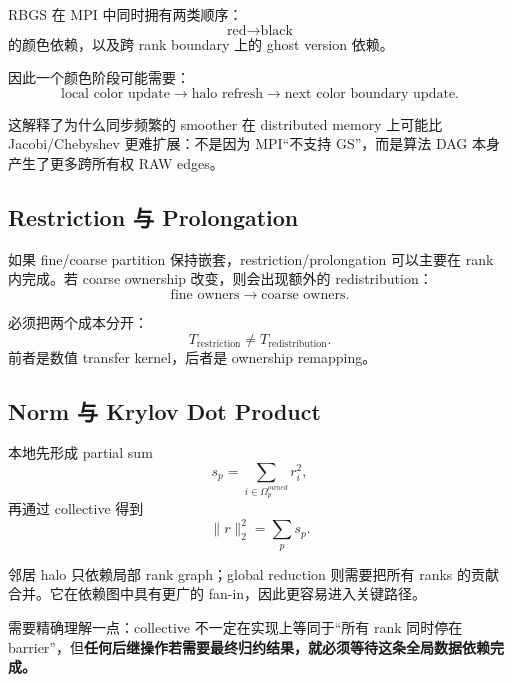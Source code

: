 RBGS 在 MPI 中同时拥有两类顺序：
\begin{equation}
\text{red}
\rightarrow
\text{black}
\end{equation}
的颜色依赖，以及跨 rank boundary 上的 ghost version 依赖。

因此一个颜色阶段可能需要：
\begin{equation}
\text{local color update}
\rightarrow
\text{halo refresh}
\rightarrow
\text{next color boundary update}.
\end{equation}

这解释了为什么同步频繁的 smoother 在 distributed memory 上可能比 Jacobi/Chebyshev 更难扩展：不是因为 MPI“不支持 GS”，而是算法 DAG 本身产生了更多跨所有权 RAW edges。

\subsection{Restriction 与 Prolongation}

如果 fine/coarse partition 保持嵌套，restriction/prolongation 可以主要在 rank 内完成。若 coarse ownership 改变，则会出现额外的 redistribution：
\begin{equation}
\text{fine owners}
\rightarrow
\text{coarse owners}.
\end{equation}

必须把两个成本分开：
\begin{equation}
\boxed{
T_{\mathrm{restriction}}
\neq
T_{\mathrm{redistribution}}.
}
\end{equation}
前者是数值 transfer kernel，后者是 ownership remapping。

\subsection{Norm 与 Krylov Dot Product}

本地先形成 partial sum
\begin{equation}
s_p
=
\sum_{i\in\Omega_p^{owned}}r_i^2,
\end{equation}
再通过 collective 得到
\begin{equation}
\|r\|_2^2
=
\sum_p s_p.
\end{equation}

邻居 halo 只依赖局部 rank graph；global reduction 则需要把所有 ranks 的贡献合并。它在依赖图中具有更广的 fan-in，因此更容易进入关键路径。

需要精确理解一点：collective 不一定在实现上等同于“所有 rank 同时停在 barrier”，但\textbf{任何后继操作若需要最终归约结果，就必须等待这条全局数据依赖完成。}

